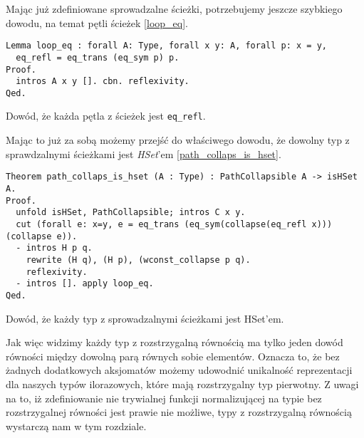 Mając już zdefiniowane sprowadzalne ścieżki, potrzebujemy jeszcze szybkiego dowodu, na temat pętli ścieżek \ref{loop_eq}.
\begin{code}
\begin{verbatim}
Lemma loop_eq : forall A: Type, forall x y: A, forall p: x = y, 
  eq_refl = eq_trans (eq_sym p) p.
Proof.
  intros A x y []. cbn. reflexivity.
Qed.
\end{verbatim}
\caption{Dowód, że każda pętla z ścieżek jest \texttt{eq_refl}.}
\label{loop_eq}
\end{code}
Mając to już za sobą możemy przejść do właściwego dowodu, że dowolny typ z sprawdzalnymi ścieżkami jest \emph{HSet}'em \ref{path_collaps_is_hset}.
\begin{code}
\begin{verbatim}
Theorem path_collaps_is_hset (A : Type) : PathCollapsible A -> isHSet A.
Proof.
  unfold isHSet, PathCollapsible; intros C x y.
  cut (forall e: x=y, e = eq_trans (eq_sym(collapse(eq_refl x))) (collapse e)).
  - intros H p q. 
    rewrite (H q), (H p), (wconst_collapse p q).
    reflexivity.
  - intros []. apply loop_eq.
Qed.
\end{verbatim}
\caption{Dowód, że każdy typ z sprowadzalnymi ścieżkami jest HSet'em.}
\label{path_collaps_is_hset}
\end{code}
Jak więc widzimy każdy typ z rozstrzygalną równością ma tylko jeden dowód równości między dowolną parą równych sobie elementów. Oznacza to, że bez żadnych dodatkowych aksjomatów możemy udowodnić unikalność reprezentacji dla naszych typów ilorazowych, które mają rozstrzygalny typ pierwotny. Z uwagi na to, iż zdefiniowanie nie trywialnej funkcji normalizującej na typie bez rozstrzygalnej równości jest prawie nie możliwe, typy z rozstrzygalną równością wystarczą nam w tym rozdziale.
